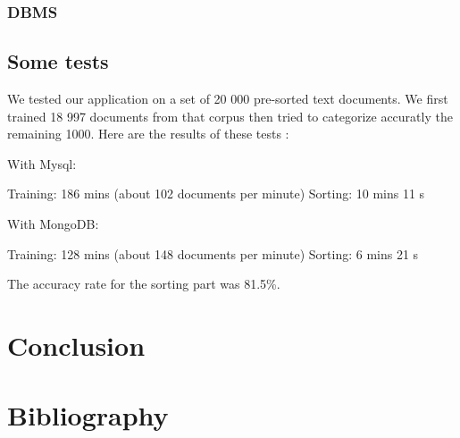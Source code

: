 \documentclass[a4paper,11pt]{article}
\begin{document}
\subsubsection{DBMS}


\subsection{Some tests}
    
We tested our application on a set of 20 000 pre-sorted text documents. We
first trained 18 997 documents from that corpus then tried to categorize
accuratly the remaining 1000. Here are the results of these tests :

With Mysql:

Training: 186 mins (about 102 documents per minute)
Sorting: 10 mins 11 s

With MongoDB:

Training: 128 mins (about 148 documents per minute)
Sorting: 6 mins 21 s

The accuracy rate for the sorting part was 81.5\%.

\section*{Conclusion}


\clearpage
\section*{Bibliography}
\end{document}
